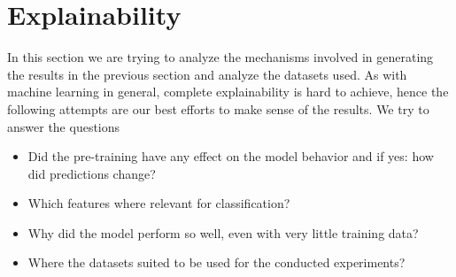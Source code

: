 
























\section{Explainability}

In this section we are trying to analyze the mechanisms involved in generating the results in the previous section and analyze the datasets used. As with machine learning in general, complete explainability is hard to achieve, hence the following attempts are our best efforts to make sense of the results. We try to answer the questions

\begin{itemize}
	\item Did the pre-training have any effect on the model behavior and if yes: how did predictions change?
	\item Which features where relevant for classification? 
	\item Why did the model perform so well, even with very little training data?
	\item Where the datasets suited to be used for the conducted experiments?
\end{itemize}

